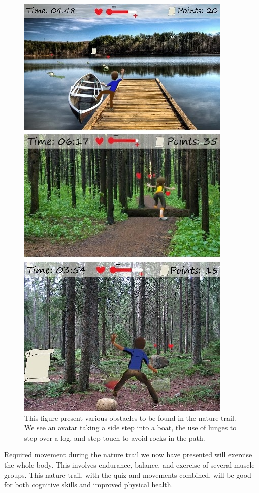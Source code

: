 \begin{figure} [H]
\centering
\includegraphics[scale=0.67]{hindringer2Eng.jpg}
\caption[Nature trail - obstacles, part two]{This figure present various obstacles to be found in the nature trail. We see an avatar taking a side step into a boat, the use of lunges to step over a log, and step touch to avoid rocks in the path.}
\label{fig:hindring2}
\end{figure}

Required movement during the nature trail we now have presented will exercise the whole body. This involves endurance, balance, and exercise of several muscle groups. This nature trail, with the quiz and movements combined, will be good for both cognitive skills and improved physical health.  

